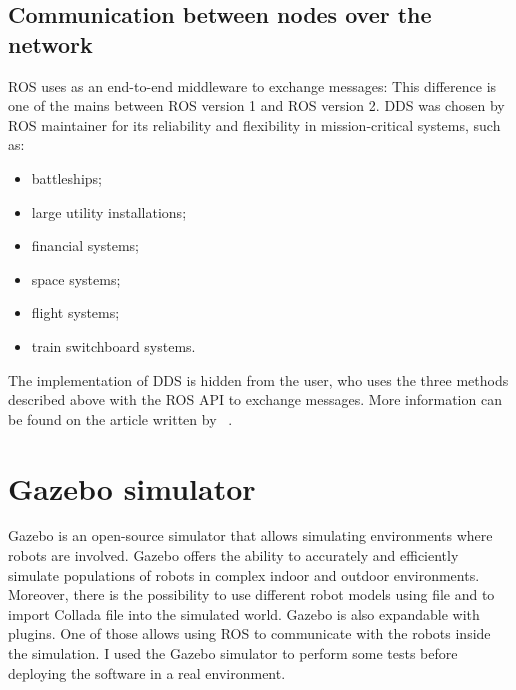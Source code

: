 \documentclass[../thesis.tex]{subfiles}
\begin{document}
\subsection{Communication between nodes over the network}
\gls{ROS} uses  as an end-to-end middleware to exchange messages:  This difference is one of the mains between \gls{ROS} version 1 and \gls{ROS} version 2. \gls{DDS} was chosen by \gls{ROS} maintainer for its reliability and flexibility in mission-critical systems, such as:
\begin{itemize}
    \item battleships;
    \item large utility installations;
    \item financial systems;
    \item space systems;
    \item flight systems;
    \item train switchboard systems.
\end{itemize}
The implementation of \gls{DDS} is hidden from the user, who uses the three methods described above with the \gls{ROS} API to exchange messages. More information can be found on the article written by \citeauthor{site:ros_dds}~\cite{site:ros_dds}.

\section{Gazebo simulator}
Gazebo is an open-source simulator that allows simulating environments where robots are involved. Gazebo offers the ability to accurately and efficiently simulate populations of robots in complex indoor and outdoor environments. Moreover, there is the possibility to use different robot models using  file and to import Collada file into the simulated world. Gazebo is also expandable with plugins. One of those allows using \acrshort{ROS} to communicate with the robots inside the simulation. I used the Gazebo simulator to perform some tests before deploying the software in a real environment. 
\end{document}
